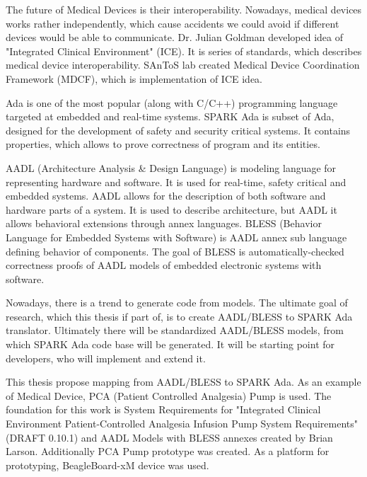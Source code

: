 
\pagestyle{empty}
\setlength{\baselineskip}{0.8cm}

\indent


The future of Medical Devices is their interoperability. Nowadays, medical devices works rather independently, which cause accidents we could avoid if different devices would be able to communicate. Dr. Julian Goldman developed idea of "Integrated Clinical Environment" (ICE). It is series of standards, which describes medical device interoperability. SAnToS lab created Medical Device Coordination Framework (MDCF), which is implementation of ICE idea.

Ada is one of the most popular (along with C/C++) programming language targeted at embedded and real-time systems. SPARK Ada is subset of Ada, designed for the development of safety and security critical systems. It contains properties, which allows to prove correctness of program and its entities.

AADL (Architecture Analysis \& Design Language) is modeling language for representing hardware and software. It is used for real-time, safety critical and embedded systems. AADL allows for the description of both software and hardware parts of a system. It is used to describe architecture, but AADL it allows behavioral extensions through annex languages. BLESS (Behavior Language for Embedded Systems with Software) is AADL annex sub language defining behavior of components. The goal of BLESS is automatically-checked correctness proofs of AADL models of embedded electronic systems with software.

Nowadays, there is a trend to generate code from models. The ultimate goal of research, which this thesis if part of, is to create AADL/BLESS to SPARK Ada translator. Ultimately there will be standardized AADL/BLESS models, from which SPARK Ada code base will be generated. It will be starting point for developers, who will implement and extend it.

This thesis propose mapping from AADL/BLESS to SPARK Ada. As an example of Medical Device, PCA (Patient Controlled Analgesia) Pump is used. The foundation for this work is System Requirements for "Integrated Clinical Environment Patient-Controlled Analgesia Infusion Pump System Requirements" (DRAFT 0.10.1) \cite{PcaReq} and AADL Models with BLESS annexes created by Brian Larson. Additionally PCA Pump prototype was created. As a platform for prototyping, BeagleBoard-xM device was used.
